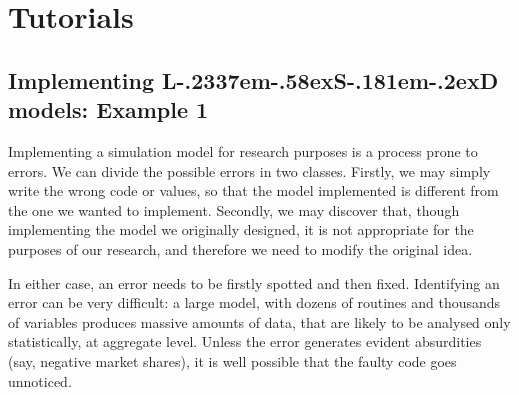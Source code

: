 \documentclass [11pt,a4paper] {book}
\def\LsD{{L\kern-.2337em\lower-.58ex\hbox{S}\kern-.181em\lower-.2ex\hbox{D}}\xspace}
\begin{document}





\chapter{Tutorials}\label{ch:tutorials}
\section{Implementing \LsD models: Example 1}\label{sec:tut1}

Implementing a simulation model for research purposes is a process prone to errors. We can divide the possible errors in two classes. Firstly, we may simply write the wrong code or values, so that the model implemented is different from the one we wanted to implement. Secondly, we may discover that, though implementing the model we originally designed, it is not appropriate for the purposes of our research, and therefore we need to modify the original idea. 

In either case, an error needs to be firstly spotted and then fixed. Identifying an error can be very difficult: a large model, with dozens of routines and thousands of variables produces massive amounts of data, that are likely to be analysed only statistically, at aggregate level. Unless the error generates evident absurdities (say, negative market shares), it is well possible that the faulty code goes unnoticed. 
\end{document}
